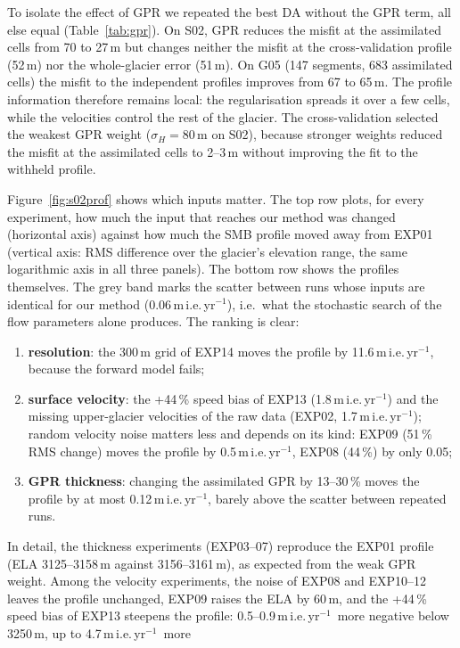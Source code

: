 \documentclass[10pt,a4paper]{article}
\newcommand{\mie}{m\,i.e.\,yr$^{-1}$}
\begin{document}
To isolate the effect of GPR we repeated the best DA without the GPR term, all else equal (Table~\ref{tab:gpr}). On S02,
GPR reduces the misfit at the assimilated cells from 70 to 27\,m but changes neither the misfit at the cross-validation
profile (52\,m) nor the whole-glacier error (51\,m). On G05 (147 segments, 683 assimilated cells) the misfit to the
independent profiles improves from 67 to 65\,m.
The profile information therefore remains local: the regularisation spreads it over a few cells, while the velocities
control the rest of the glacier. The cross-validation selected the weakest GPR weight ($\sigma_H=80$\,m on S02),
because stronger weights reduced the misfit at the assimilated cells to 2--3\,m without improving the fit to the
withheld profile.

Figure~\ref{fig:s02prof} shows which inputs matter. The top row plots, for every experiment, how much the input that
reaches our method was changed (horizontal axis) against how much the SMB profile moved away from EXP01 (vertical axis:
RMS difference over the glacier's elevation range, the same logarithmic axis in all three panels). The bottom row shows
the profiles themselves. The grey band marks the scatter between runs whose inputs are identical for our method
(0.06\,\mie), i.e.\ what the stochastic search of the flow parameters alone produces. The ranking is clear:
\begin{enumerate}\setlength{\itemsep}{1pt}
\item \textbf{resolution}: the 300\,m grid of EXP14 moves the profile by 11.6\,\mie, because the forward model fails;
\item \textbf{surface velocity}: the +44\,\% speed bias of EXP13 (1.8\,\mie) and the missing upper-glacier velocities of the
raw data (EXP02, 1.7\,\mie); random velocity noise matters less and depends on its kind: EXP09 (51\,\%
RMS change) moves the profile by 0.5\,\mie, EXP08 (44\,\%) by only 0.05;
\item \textbf{GPR thickness}: changing the assimilated GPR by 13--30\,\% moves the profile by at most
0.12\,\mie, barely above the scatter between repeated runs.
\end{enumerate}
In detail, the thickness experiments (EXP03--07) reproduce
the EXP01 profile (ELA 3125--3158\,m against 3156--3161\,m), as expected from the weak GPR weight. Among the velocity
experiments, the noise of EXP08 and EXP10--12 leaves the profile unchanged, EXP09 raises the ELA by 60\,m, and the
+44\,\% speed bias of EXP13 steepens the profile: 0.5--0.9\,\mie\ more negative below 3250\,m, up to 4.7\,\mie\ more
\end{document}
